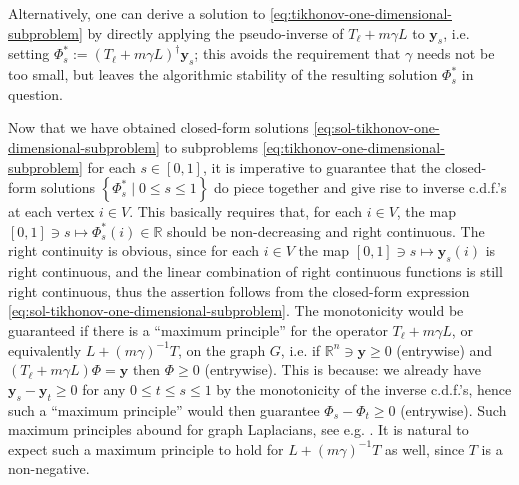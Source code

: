 \documentclass[letterpaper]{article} %
\begin{document}
\begin{remark}
  Alternatively, one can derive a solution to \eqref{eq:tikhonov-one-dimensional-subproblem} by directly applying the pseudo-inverse of $T_{\ell}+m\gamma L$ to $\mathbf{y}_s$, i.e. setting $\Phi_s^{*}:=\left( T_{\ell}+m\gamma L \right)^{\dagger}\mathbf{y}_s$; this avoids the requirement that $\gamma$ needs not be too small, but leaves the algorithmic stability of the resulting solution $\Phi_s^{*}$ in question.
\end{remark}

Now that we have obtained closed-form solutions \eqref{eq:sol-tikhonov-one-dimensional-subproblem} to subproblems \eqref{eq:tikhonov-one-dimensional-subproblem} for each $s\in \left[ 0,1 \right]$, it is imperative to guarantee that the closed-form solutions $\left\{ \Phi_s^{*}\mid 0\leq s\leq 1 \right\}$ do piece together and give rise to inverse c.d.f.'s at each vertex $i\in V$. This basically requires that, for each $i\in V$, the map $\left[ 0,1 \right]\ni s\mapsto \Phi_s^{*}\left( i \right)\in\mathbb{R}$ should be non-decreasing and right continuous. The right continuity is obvious, since for each $i\in V$ the map $\left[ 0,1 \right]\ni s\mapsto \mathbf{y}_s \left( i \right)$ is right continuous, and the linear combination of right continuous functions is still right continuous, thus the assertion follows from the closed-form expression \eqref{eq:sol-tikhonov-one-dimensional-subproblem}. The monotonicity would be guaranteed if there is a ``maximum principle'' for the operator $T_{\ell}+m\gamma L$, or equivalently $L+\left( m\gamma \right)^{-1}T$, on the graph $G$, i.e. if $\mathbb{R}^{n}\ni \mathbf{y}\geq 0$ (entrywise) and $\left( T_{\ell}+m\gamma L \right)\Phi=\mathbf{y}$ then $\Phi\geq 0$ (entrywise). This is because: we already have $\mathbf{y}_s-\mathbf{y}_t\geq 0$ for any $0\leq t\leq s\leq 1$ by the monotonicity of the inverse c.d.f.'s, hence such a ``maximum principle'' would then guarantee $\Phi_s-\Phi_t\geq 0$ (entrywise). Such maximum principles abound for graph Laplacians, see e.g. \cite{HS1997,CCK2007}. It is natural to expect such a maximum principle to hold for $L+\left( m\gamma \right)^{-1}T$ as well, since $T$ is a non-negative.
\end{document}

